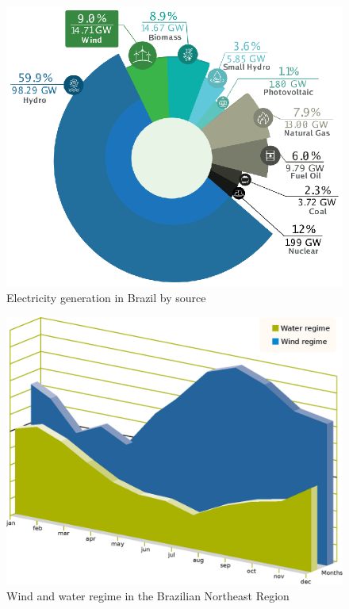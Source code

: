 \begin{figure}[]
	\caption{Electricity generation in Brazil by source}
	\begin{center}
		\includegraphics[scale=0.8]{Images/BRshare19.eps}
	\end{center}
	\label{fig: BRshare}
\end{figure}

\begin{figure}[]
	\caption{Wind and water regime in the Brazilian Northeast Region}
	\begin{center}
		\includegraphics[scale=0.5]{Images/WindWater.eps}
	\end{center}
	\label{fig: WindWater}
\end{figure}

